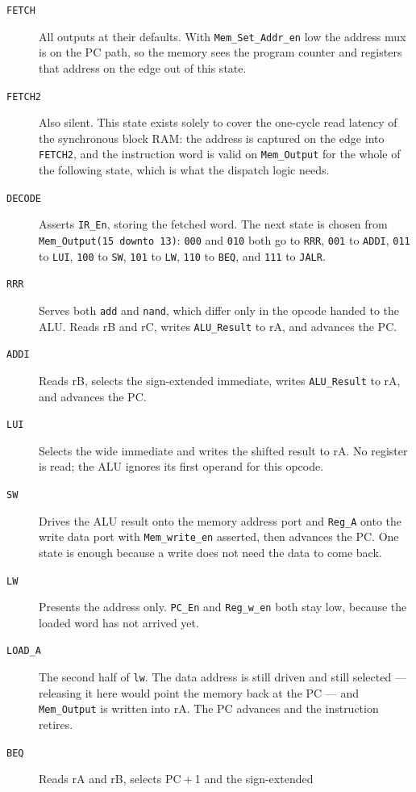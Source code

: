 \documentclass[11pt,letterpaper]{article}
\begin{document}
\begin{description}
  \item[\texttt{FETCH}] All outputs at their defaults. With
    \texttt{Mem\_Set\_Addr\_en} low the address mux is on the PC path, so the
    memory sees the program counter and registers that address on the edge out
    of this state.
  \item[\texttt{FETCH2}] Also silent. This state exists solely to cover the
    one-cycle read latency of the synchronous block RAM: the address is
    captured on the edge into \texttt{FETCH2}, and the instruction word is
    valid on \texttt{Mem\_Output} for the whole of the following state, which
    is what the dispatch logic needs.
  \item[\texttt{DECODE}] Asserts \texttt{IR\_En}, storing the fetched word.
    The next state is chosen from \texttt{Mem\_Output(15 downto 13)}: \texttt{000}
    and \texttt{010} both go to \texttt{RRR}, \texttt{001} to \texttt{ADDI},
    \texttt{011} to \texttt{LUI}, \texttt{100} to \texttt{SW}, \texttt{101} to
    \texttt{LW}, \texttt{110} to \texttt{BEQ}, and \texttt{111} to
    \texttt{JALR}.
  \item[\texttt{RRR}] Serves both \texttt{add} and \texttt{nand}, which differ
    only in the opcode handed to the ALU. Reads rB and rC, writes
    \texttt{ALU\_Result} to rA, and advances the PC.
  \item[\texttt{ADDI}] Reads rB, selects the sign-extended immediate, writes
    \texttt{ALU\_Result} to rA, and advances the PC.
  \item[\texttt{LUI}] Selects the wide immediate and writes the shifted result
    to rA. No register is read; the ALU ignores its first operand for this
    opcode.
  \item[\texttt{SW}] Drives the ALU result onto the memory address port and
    \texttt{Reg\_A} onto the write data port with \texttt{Mem\_write\_en}
    asserted, then advances the PC. One state is enough because a write does
    not need the data to come back.
  \item[\texttt{LW}] Presents the address only. \texttt{PC\_En} and
    \texttt{Reg\_w\_en} both stay low, because the loaded word has not arrived
    yet.
  \item[\texttt{LOAD\_A}] The second half of \texttt{lw}. The data address is
    still driven and still selected --- releasing it here would point the
    memory back at the PC --- and \texttt{Mem\_Output} is written into rA. The
    PC advances and the instruction retires.
  \item[\texttt{BEQ}] Reads rA and rB, selects PC${}+{}$1 and the sign-extended

\end{description}
\end{document}
